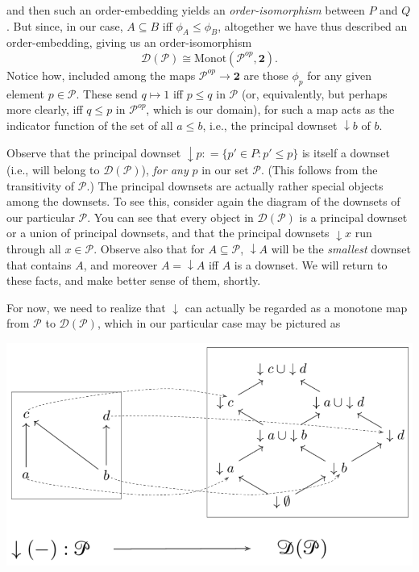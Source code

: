 \documentclass[11pt]{book}
\theoremstyle{definition}
\theoremstyle{definition}
\theoremstyle{definition}
\theoremstyle{theorem}
\theoremstyle{definition}
\begin{document}
and then such an order-embedding yields an \textit{order-isomorphism}  between $P$ and $Q$.
But since, in our case, $A \subseteq  B$ iff $\phi_A \leq \phi_B$, altogether we have thus described an order-embedding, giving us an order-isomorphism   
\begin{equation*}
\mathcal{D}(\mathcal{P}) \cong \text{Monot}(\mathcal{P}^{op}, \textbf{2}). 
\end{equation*}   
Notice how, included among the maps $\mathcal{P}^{op} \rightarrow \textbf{2}$ are those $\phi_p$ for any given element $p \in \mathcal{P}$. These send $q \mapsto 1$ iff $p \leq q$ in $\mathcal{P}$ (or, equivalently, but perhaps more clearly, iff $q \leq p$ in $\mathcal{P}^{op}$, which is our domain), for such a map acts as the indicator function of the set of all $a \leq b$, i.e., the principal downset $\downarrow b$ of $b$. \par 
Observe that the principal downset $\downarrow p : = \{p' \in P : p' \leq p \}$ is itself a downset (i.e., will belong to $\mathcal{D}(\mathcal{P})$), \textit{for any} $p$ in our set $\mathcal{P}$. (This follows from the transitivity of $\mathcal{P}$.) The principal downsets are actually rather special objects among the downsets. To see this, consider again the diagram of the downsets of our particular $\mathcal{P}$. You can see that every object in $\mathcal{D}(\mathcal{P})$ is a principal downset or a union of principal downsets, and that the principal downsets $\downarrow x$ run through all $x \in \mathcal{P}$. Observe also that for $A \subseteq  \mathcal{P}$, $\downarrow A$ will be the \textit{smallest} downset that contains $A$, and moreover $A = \downarrow A$ iff $A$ is a downset. We will return to these facts, and make better sense of them, shortly. \par 
For now, we need to realize that $\downarrow$ can actually be regarded as a monotone map from $\mathcal{P}$ to $\mathcal{D}(\mathcal{P})$, which in our particular case may be pictured as 
\begin{center}
	\includegraphics*[scale=0.25]{DownSetFunctor.png}
\end{center}
\end{document}
